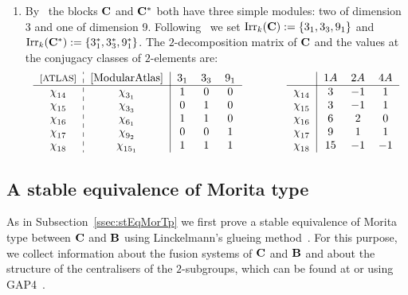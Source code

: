 \begin{nota}
\begin{enumerate}[label=(\arabic*),start=11]
\[\begin{tabular}{c|ccc}
            $\chi^{}_{5}$ & $7$ & $-1$ & $-1$\\
        \end{tabular}
        \]
    \item\label{nota:3A6-decompMatrixA} By~\cite[A6mod2]{ModularAtlas} the blocks ${\mathbf{C}}$ and ${\mathbf{C}}^\ast$ both have three simple modules: two of dimension 3 and one of dimension 9. Following~\cite[A6mod2]{ModularAtlas} we set $\operatorname{Irr}_k({\mathbf{C}}):=\{3_1,3_3, 9_1\}$  and $\operatorname{Irr}_k({\mathbf{C}}^\ast):=\{3_1^\ast, 3_3^\ast, 9_1^\ast\}$. The $2$-decomposition matrix of ${\mathbf{C}}$ and the values at the conjugacy classes of $2$-elements are: 
        \[
        \begin{tabular}{c:c|ccc}{\footnotesize{\cite[p.4]{ATLAS}}} &  \cite{ModularAtlas} & $3_1$ & $3_3$ & $9_1$\\
            \hline  
            $\chi^{}_{14}$ & $\chi^{}_{3_1}$  & $1$ & $0$ & $0$\\
            $\chi^{}_{15}$ & $\chi^{}_{3_3}$ & $0$ & $1$ & $0$\\
            $\chi^{}_{16}$ & $\chi^{}_{6_1}$ & $1$ & $1$ & $0$\\
            $\chi^{}_{17}$ & $\chi^{}_{9_2}$ & $0$ & $0$ & $1$\\
            $\chi^{}_{18}$ & $\chi^{}_{15_1}$ & $1$ & $1$ & $1$\\
        \end{tabular}
        \qquad \qquad
        \begin{tabular}{c|ccc} &  $1A$ & $2A$ & $4A$\\
            \hline  
            $\chi^{}_{14}$ & $3$  & $-1$ & $1$\\
            $\chi^{}_{15}$ & $3$ & $-1$ & $1$\\
            $\chi^{}_{16}$ & $6$ & $2$ & $0$\\
            $\chi^{}_{17}$ & $9$ & $1$ & $1$\\
            $\chi^{}_{18}$ & $15$ & $-1$ & $-1$\\
        \end{tabular}
        \]        
\end{enumerate} 
\end{nota}


\vspace{2mm}
\subsection{A stable equivalence of Morita type}
As in Subsection~\ref{ssec:stEqMorTp} we first prove a stable equivalence of Morita type between ${\mathbf{C}}$ and ${\mathbf{B}}$ using Linckelmann's glueing method~\cite[Theorem~3.1]{Lin01}. For this purpose, we collect information about the fusion systems of ${\mathbf{C}}$ and ${\mathbf{B}}$ and about the structure of the centralisers of the $2$-subgroups, which can be found at \cite[Groups/Abstract/1080.260 and Groups/Abstract/168.42]{lmfdb} or using GAP4~\cite{GAP}.


